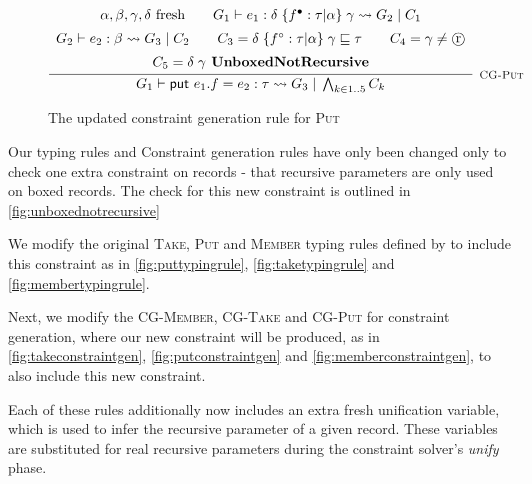 \begin{figure}
    \centering
    \[
        \infer[\textsc{\footnotesize{CG-Put}}]{
            G_1 \vdash \textsf{put } e_1.f = e_2 : \tau \rightsquigarrow G_3\; 
                |\; \bigwedge_{k \in 1..5} C_k
        }{
            \begin{array}{c}
                \alpha, \beta, \gamma, \delta \text{ fresh}
                \hspace{2em}
                G_1 \vdash e_1 : \delta\; \{ f^\bullet: \tau | \alpha \}\; 
                    \gamma \rightsquigarrow G_2\; |\; C_1 \\[5pt]
                G_2 \vdash e_2 : \beta \rightsquigarrow G_3\; |\; C_2
                \hspace{2em}
                C_3 =  \delta\; \{ f^\circ : \tau | \alpha \}\; 
                    \gamma \subtype \tau
                \hspace{2em}
                C_4 = \gamma \neq \text{\textcircled{r}} \\[5pt]
                C_5 = \delta\; \gamma \textbf{ UnboxedNotRecursive}
            \end{array}
        }
    \]
    
    \caption{The updated constraint generation rule for \textsc{Put}}
    \label{fig:putconstraintgen}
\end{figure}

Our typing rules and Constraint generation rules have only been changed only to check one extra
constraint on records - that recursive parameters are only used on boxed records. The check for this
new constraint is outlined in \autoref{fig:unboxednotrecursive}

We modify the original \textsc{Take}, \textsc{Put} and \textsc{Member} typing rules defined by
\citet{LiamThesis} to include this constraint as in \autoref{fig:puttypingrule},
\autoref{fig:taketypingrule} and \autoref{fig:membertypingrule}.

Next, we modify the \textsc{CG-Member}, \textsc{CG-Take} and \textsc{CG-Put} for constraint generation,
where our new constraint will be produced, as in \autoref{fig:takeconstraintgen}, 
\autoref{fig:putconstraintgen} and \autoref{fig:memberconstraintgen}, to also include this
new constraint.

Each of these rules additionally now includes an extra fresh unification variable, which is
used to infer the recursive parameter of a given record. These variables are substituted
for real recursive parameters during the constraint solver's \textit{unify} phase.

